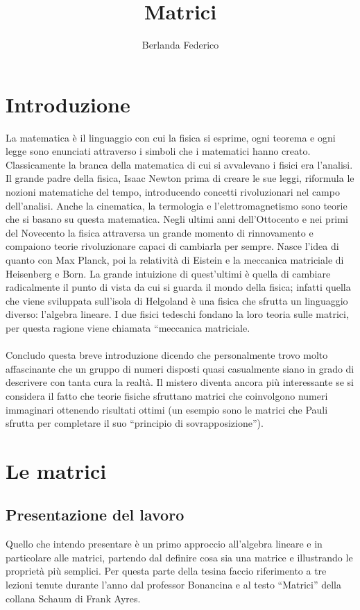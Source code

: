\documentclass[a4paper]{article}
\title{Matrici}
\author{Berlanda Federico}
\begin{document}
\maketitle



\section{Introduzione}

La matematica è il linguaggio con cui la fisica si esprime, ogni teorema e ogni legge sono enunciati attraverso i simboli che i matematici hanno creato.
Classicamente la branca della matematica di cui si avvalevano i fisici era l’analisi. Il grande padre della fisica, Isaac Newton prima di creare le sue leggi, riformula le nozioni matematiche del tempo, introducendo concetti rivoluzionari nel campo dell’analisi. Anche la cinematica, la termologia e l’elettromagnetismo sono teorie che si basano su questa matematica.
Negli ultimi anni dell’Ottocento e nei primi del Novecento la fisica attraversa un grande momento di rinnovamento e compaiono teorie rivoluzionare capaci di cambiarla per sempre. Nasce l’idea di quanto con Max Planck, poi la relatività di Eistein e la meccanica matriciale di Heisenberg e Born.
La grande intuizione di quest’ultimi è quella di cambiare radicalmente il punto di vista da cui si guarda il mondo della fisica; infatti quella che viene sviluppata sull’isola di Helgoland è una fisica che sfrutta un linguaggio diverso: l’algebra lineare. I due fisici tedeschi fondano la loro teoria sulle matrici, per questa ragione viene chiamata “meccanica matriciale.
\\
\\Concludo questa breve introduzione dicendo che personalmente trovo molto affascinante che un gruppo di numeri disposti quasi casualmente siano in grado di descrivere con tanta cura la realtà. Il mistero diventa ancora più interessante se si considera il fatto che teorie fisiche sfruttano matrici che coinvolgono numeri immaginari ottenendo risultati ottimi (un esempio sono le matrici che Pauli sfrutta per completare il suo “principio di sovrapposizione”).

\section{Le matrici}

\subsection{Presentazione del lavoro}
Quello che intendo presentare è un primo approccio all’algebra lineare e in particolare alle matrici, partendo dal definire cosa sia una matrice e illustrando le proprietà più semplici. Per questa parte della tesina faccio riferimento a tre lezioni tenute durante l’anno dal professor Bonancina e al testo “Matrici” della collana Schaum di Frank Ayres.
\end{document}
